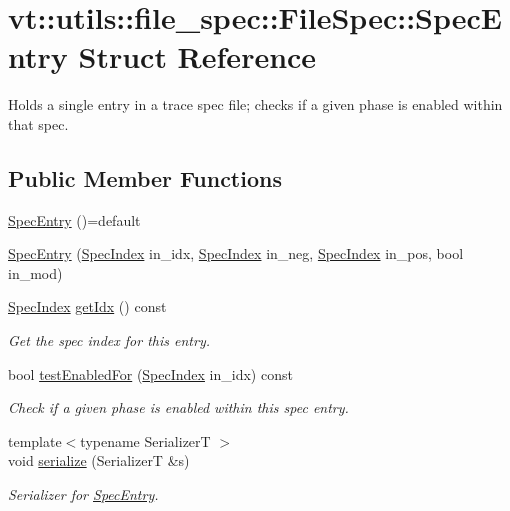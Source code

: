 \hypertarget{structvt_1_1utils_1_1file__spec_1_1_file_spec_1_1_spec_entry}{}\section{vt\+:\+:utils\+:\+:file\+\_\+spec\+:\+:File\+Spec\+:\+:Spec\+Entry Struct Reference}
\label{structvt_1_1utils_1_1file__spec_1_1_file_spec_1_1_spec_entry}


Holds a single entry in a trace spec file; checks if a given phase is enabled within that spec.  


\subsection*{Public Member Functions}
\begin{DoxyCompactItemize}
\item 
\hyperlink{structvt_1_1utils_1_1file__spec_1_1_file_spec_1_1_spec_entry_a397a1ede199e831a0a532171c912936c}{Spec\+Entry} ()=default
\item 
\hyperlink{structvt_1_1utils_1_1file__spec_1_1_file_spec_1_1_spec_entry_a4413c3e9ba86a4a1077d48a9fee7f0cd}{Spec\+Entry} (\hyperlink{structvt_1_1utils_1_1file__spec_1_1_file_spec_a3817fca09dbe932e0f6ba5729f1965ba}{Spec\+Index} in\+\_\+idx, \hyperlink{structvt_1_1utils_1_1file__spec_1_1_file_spec_a3817fca09dbe932e0f6ba5729f1965ba}{Spec\+Index} in\+\_\+neg, \hyperlink{structvt_1_1utils_1_1file__spec_1_1_file_spec_a3817fca09dbe932e0f6ba5729f1965ba}{Spec\+Index} in\+\_\+pos, bool in\+\_\+mod)
\item 
\hyperlink{structvt_1_1utils_1_1file__spec_1_1_file_spec_a3817fca09dbe932e0f6ba5729f1965ba}{Spec\+Index} \hyperlink{structvt_1_1utils_1_1file__spec_1_1_file_spec_1_1_spec_entry_a4402ebf9148659e8d11d9b1885cfff9d}{get\+Idx} () const
\begin{DoxyCompactList}\small\item\em Get the spec index for this entry. \end{DoxyCompactList}\item 
bool \hyperlink{structvt_1_1utils_1_1file__spec_1_1_file_spec_1_1_spec_entry_ac78d47ddf2329363f238a874856bd9f9}{test\+Enabled\+For} (\hyperlink{structvt_1_1utils_1_1file__spec_1_1_file_spec_a3817fca09dbe932e0f6ba5729f1965ba}{Spec\+Index} in\+\_\+idx) const
\begin{DoxyCompactList}\small\item\em Check if a given phase is enabled within this spec entry. \end{DoxyCompactList}\item 
{\footnotesize template$<$typename SerializerT $>$ }\\void \hyperlink{structvt_1_1utils_1_1file__spec_1_1_file_spec_1_1_spec_entry_a15f1a633aded145bed62a5a7d69ca658}{serialize} (SerializerT \&s)
\begin{DoxyCompactList}\small\item\em Serializer for {\ttfamily \hyperlink{structvt_1_1utils_1_1file__spec_1_1_file_spec_1_1_spec_entry}{Spec\+Entry}}. \end{DoxyCompactList}\end{DoxyCompactItemize}
